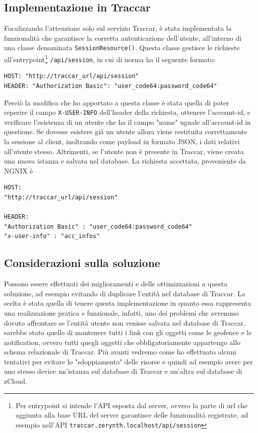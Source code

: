 \documentclass[a4paper,titlepage,12pt]{report}
\begin{document}
{\subsection{
Implementazione in Traccar}
Focalizzando l'attenzione solo sul servizio Traccar, è stata implementata la funzionalità che garantisce la corretta autenticazione dell'utente, all'interno di una classe denominata \texttt{SessionResource()}. Questa classe gestisce le richieste all'entrypoint\footnote{Per entrypoint si intende l'API esposta dal server, ovvero la parte di url che aggiunta alla base URL del server garantisce delle funzionalità registrate, ad esempio nell'API \texttt{traccar.zerynth.localhost/api/session}} \texttt{/api/session}, in cui di norma ha il seguente formato:
\begin{verbatim}
HOST: "http://traccar_url/api/session"
HEADER: "Authorization Basic": "user_code64:password_code64"

\end{verbatim}

Perciò la modifica che ho apportato a questa classe è stata quella di poter reperire il campo \texttt{X-USER-INFO} dell'header della richiesta, ottenere l'account-id, e verificare l'esistenza di un utente che ha il campo "name" uguale all'account-id in questione. Se dovesse esistere già un utente allora viene restituita correttamente la sessione al client, inoltrando come payload in formato JSON, i dati relativi all'utente stesso. Altrimenti, se l'utente non è presente in Traccar, viene creata una nuova istanza e salvata nel database. La richiesta accettata, proveniente da NGNIX è 

\begin{verbatim}
HOST:
"http://traccar_url/api/session"

HEADER: 
"Authorization Basic" : "user_code64:password_code64"
"x-user-info" : "acc_infos"
\end{verbatim}

\subsection{
Considerazioni sulla soluzione}
Possono essere effettuati dei miglioramenti e delle ottimizzazioni a questa soluzione, ad esempio evitando di duplicare l'entità nel database di Traccar. La scelta è stata quella di tenere questa implementazione in quanto essa rappresenta una realizzazione pratica e funzionale, infatti, uno dei problemi che avremmo dovuto affrontare se l'entità utente non venisse salvata nel database di Traccar, sarebbe stato quello di mantenere tutti i link con gli oggetti come le geofence e le notification, ovvero tutti quegli oggetti che obbligatoriamente appartengo allo schema relazionale di Traccar. Più avanti vedremo come ho effettuato alcuni tentativi per evitare lo "sdoppiamento" delle risorse e quindi ad esempio avere per uno stesso device un'istanza sul database di Traccar e un'altra sul database di zCloud.


}
\end{document}
